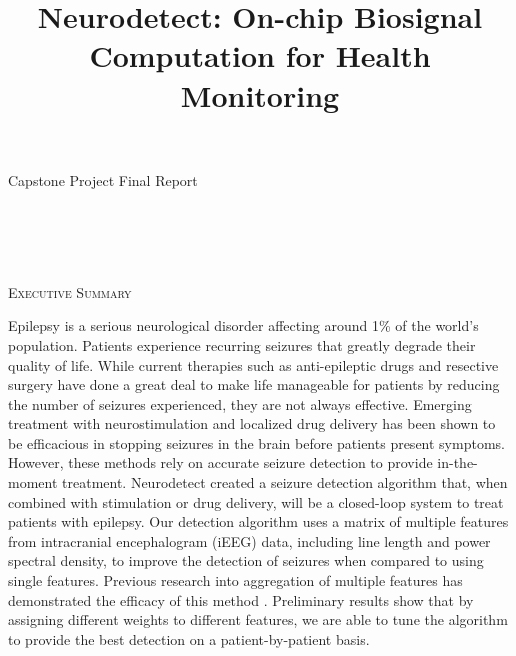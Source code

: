 \documentclass[usletter, 11pt]{extarticle}
\title{Neurodetect: On-chip Biosignal Computation for Health Monitoring}
\begin{document}

\setlength{\footskip}{20pt}

\maketitle

\begin{center}
{\large Capstone Project Final Report}\\[0.5cm]
    \\[0.5cm]
     \\
     \\
    \\[0.5cm]
\end{center}

\vspace{11pt}%


\emph{}

\begin{mdframed}
\textsc{Executive Summary}

Epilepsy is a serious neurological disorder affecting around 1\% of the world’s population. Patients experience recurring seizures that greatly degrade their quality of life. While current therapies such as anti-epileptic drugs and resective surgery have done a great deal to make life manageable for patients by reducing the number of seizures experienced, they are not always effective. Emerging treatment with neurostimulation and localized drug delivery has been shown to be efficacious in stopping seizures in the brain before patients present symptoms. However, these methods rely on accurate seizure detection to provide in-the-moment treatment. Neurodetect created a seizure detection algorithm that, when combined with stimulation or drug delivery, will be a closed-loop system to treat patients with epilepsy. Our detection algorithm uses a matrix of multiple features from intracranial encephalogram (iEEG) data, including line length and power spectral density, to improve the detection of seizures when compared to using single features. Previous research into aggregation of multiple features has demonstrated the efficacy of this method \cite{donos2015}. Preliminary results show that by assigning different weights to different features, we are able to tune the algorithm to provide the best detection on a patient-by-patient basis. 
\end{mdframed}
		
\end{document}
